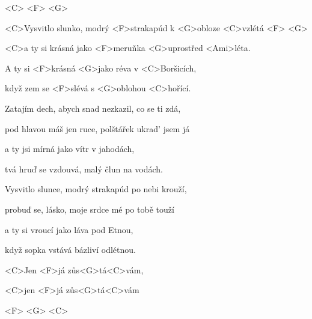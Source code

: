 

<C> <F> <G>

\zs
<C>Vysvitlo slunko, modrý <F>strakapúd k <G>obloze <C>vzlétá <F> <G>

<C>a ty si krásná jako <F>meruňka <G>uprostřed <Ami>léta.

A ty si <F>krásná <G>jako réva v <C>Boršicích,

když zem se <F>slévá s <G>oblohou <C>hořící.
\ks

\zs
Zatajím dech, abych snad nezkazil, co se ti zdá,

pod hlavou máš jen ruce, polštářek ukrad' jsem já

a ty jsi mírná jako vítr v jahodách,

tvá hruď se vzdouvá, malý člun na vodách.
\ks

\zs
Vysvitlo slunce, modrý strakapúd po nebi krouží,

probuď se, lásko, moje srdce mé po tobě touží

a ty si vroucí jako láva pod Etnou,

když sopka vstává bázliví odlétnou.
\ks

<C>Jen <F>já zůs<G>tá<C>vám,

<C>jen <F>já zůs<G>tá<C>vám

<F> <G> <C>

\kp





